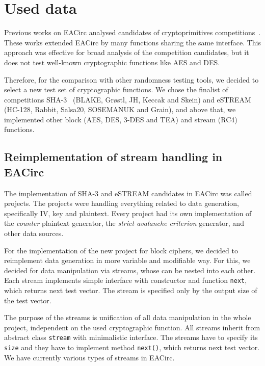 \documentclass[
  print, %
  Table,   %
  nolof,     %
  nolot,     %
  11pt, %
  oneside  %
]{fithesis3}
\begin{document}
\section{Used data}
\label{sec:method-data}

Previous works on EACirc analysed candidates of cryptoprimitives competitions~\cite{estreamMgrThesis,sha3Thesis,ukropMgrThesis}. These works extended EACirc by many functions sharing the same interface. This approach was effective for broad analysis of the competition candidates, but it does not test well-known cryptographic functions like AES and DES.

Therefore, for the comparison with other randomness testing tools, we decided to select a new test set of cryptographic functions. We chose the finalist of competitions SHA-3~\cite{sha3-competition} (BLAKE, Gr\o stl, JH, Keccak and Skein) and eSTREAM~\cite{estream-competition} (HC-128, Rabbit, Salsa20, SOSEMANUK and Grain), and above that, we implemented other block (AES, DES, 3-DES and TEA) and stream (RC4) functions.

\subsection{Reimplementation of stream handling in EACirc}
\label{subsec:method-data-streams}

The implementation of SHA-3 and eSTREAM candidates in EACirc was called projects. The projects were handling everything related to data generation, specifically IV, key and plaintext. Every project had its own implementation of the \textit{counter} plaintext generator, the \textit{strict avalanche criterion} generator, and other data sources.

For the implementation of the new project for block ciphers, we decided to reimplement data generation in more variable and modifiable way. For this, we decided for data manipulation via streams, whose can be nested into each other. Each stream implements simple interface with constructor and function \texttt{next}, which returns next test vector. The stream is specified only by the output size of the test vector.

The purpose of the streams is unification of all data manipulation in the whole project, independent on the used cryptographic function. All streams inherit from abstract class \texttt{stream} with minimalistic interface. The streams have to specify its \texttt{size} and they have to implement method \texttt{next()}, which returns next test vector. We have currently various types of streams in EACirc.
\end{document}
